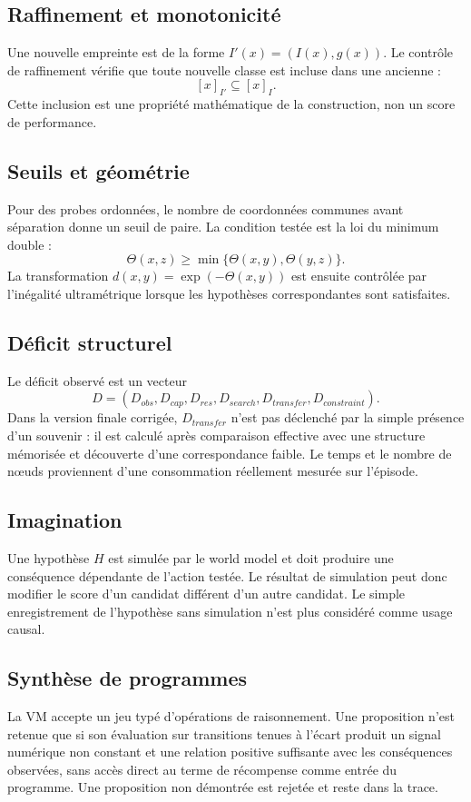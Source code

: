\documentclass[11pt,a4paper]{article}
\begin{document}
\subsection{Raffinement et monotonicité}
Une nouvelle empreinte est de la forme $I'(x)=(I(x),g(x))$. Le contrôle de raffinement vérifie que toute nouvelle classe est incluse dans une ancienne :
\[
[x]_{I'}\subseteq[x]_I.
\]
Cette inclusion est une propriété mathématique de la construction, non un score de performance.

\subsection{Seuils et géométrie}
Pour des probes ordonnées, le nombre de coordonnées communes avant séparation donne un seuil de paire. La condition testée est la loi du minimum double :
\[
\Theta(x,z)\ge \min\{\Theta(x,y),\Theta(y,z)\}.
\]
La transformation $d(x,y)=\exp(-\Theta(x,y))$ est ensuite contrôlée par l'inégalité ultramétrique lorsque les hypothèses correspondantes sont satisfaites.

\subsection{Déficit structurel}
Le déficit observé est un vecteur
\[
D=(D_{obs},D_{cap},D_{res},D_{search},D_{transfer},D_{constraint}).
\]
Dans la version finale corrigée, $D_{transfer}$ n'est pas déclenché par la simple présence d'un souvenir : il est calculé après comparaison effective avec une structure mémorisée et découverte d'une correspondance faible. Le temps et le nombre de nœuds proviennent d'une consommation réellement mesurée sur l'épisode.

\subsection{Imagination}
Une hypothèse $H$ est simulée par le world model et doit produire une conséquence dépendante de l'action testée. Le résultat de simulation peut donc modifier le score d'un candidat différent d'un autre candidat. Le simple enregistrement de l'hypothèse sans simulation n'est plus considéré comme usage causal.

\subsection{Synthèse de programmes}
La VM accepte un jeu typé d'opérations de raisonnement. Une proposition n'est retenue que si son évaluation sur transitions tenues à l'écart produit un signal numérique non constant et une relation positive suffisante avec les conséquences observées, sans accès direct au terme de récompense comme entrée du programme. Une proposition non démontrée est rejetée et reste dans la trace.
\end{document}
